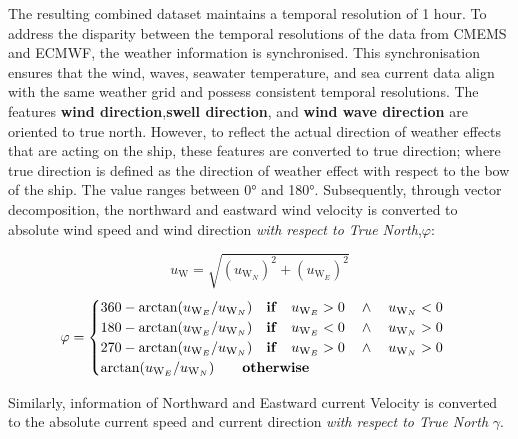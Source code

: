 \pagebreak

The resulting combined dataset maintains a temporal resolution of 1 hour. To address the disparity between the temporal resolutions of the data from CMEMS and ECMWF, the weather information is synchronised. This synchronisation ensures that the wind, waves, seawater temperature, and sea current data align with the same weather grid and possess consistent temporal resolutions. The features \textbf{wind direction},\textbf{swell direction}, and \textbf{wind wave direction} are oriented to true north. However, to reflect the actual direction of weather effects that are acting on the ship, these features are converted to true direction; where true direction is defined as the direction of weather effect with respect to the bow of the ship. The value ranges between 0° and 180°. Subsequently, through vector decomposition, the northward and eastward wind velocity is converted to absolute wind speed and wind direction \emph{with respect to True North},$\varphi$:

\begin{equation}\label{eqn:vwindabs}
    u_{\text{W}} = \sqrt{(u_{\text{W}_{N}})^2 + (u_{\text{W}_{E}})^2} 
\end{equation}
\begin{equation}\label{eqn:winddir}
    \varphi = 
    \begin{cases}
        360 - \arctan(u_{\text{W}_{E}} / u_{\text{W}_{N}}) \quad \text{\textbf{if}} \quad u_{\text{W}_{E}} > 0 \quad \wedge \quad u_{\text{W}_{N}} < 0 \\ 
        180 - \arctan(u_{\text{W}_{E}} / u_{\text{W}_{N}}) \quad \text{\textbf{if}} \quad u_{\text{W}_{E}} < 0 \quad \wedge \quad u_{\text{W}_{N}} > 0 \\ 
        270 - \arctan(u_{\text{W}_{E}} / u_{\text{W}_{N}}) \quad \text{\textbf{if}} \quad u_{\text{W}_{E}} > 0 \quad \wedge \quad u_{\text{W}_{N}} > 0 \\
        \arctan(u_{\text{W}_{E}} / u_{\text{W}_{N}}) \qquad \text{\textbf{otherwise}} 
    \end{cases}   
\end{equation}

Similarly, information of Northward and Eastward current Velocity is converted to the absolute current speed and current direction \emph{with respect to True North} $\gamma$.\\ 

